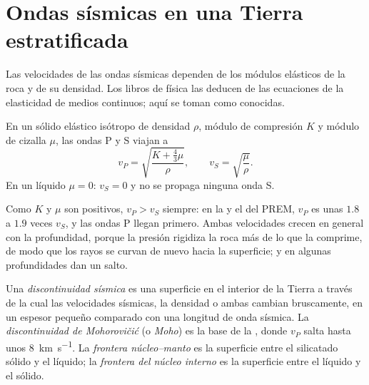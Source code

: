 \section{Ondas sísmicas en una Tierra estratificada}

Las velocidades de las ondas sísmicas dependen de los módulos elásticos de la roca y de su densidad. Los libros de física
las deducen de las ecuaciones de la elasticidad de medios continuos; aquí se toman como conocidas.

\begin{proposition}\label{prop:b1:layered-earth:speeds}
En un sólido elástico isótropo de densidad $\rho$, módulo de compresión $K$ y módulo de cizalla $\mu$, las ondas P y S
viajan a
\[
  v_P = \sqrt{\frac{K + \tfrac43\mu}{\rho}}, \qquad v_S = \sqrt{\frac{\mu}{\rho}}.
\]
En un líquido $\mu = 0$: $v_S = 0$ y no se propaga ninguna onda S.
\end{proposition}
\admitted

Como $K$ y $\mu$ son positivos, $v_P > v_S$ siempre: en la  y el  del PREM, $v_P$ es unas $1.8$ a $1.9$ veces
$v_S$, y las ondas P llegan primero. Ambas velocidades crecen en general con la profundidad, porque la presión rigidiza la
roca más de lo que la comprime, de modo que los rayos se curvan de nuevo hacia la superficie; y en algunas profundidades
dan un salto.

\begin{definition}
\label{def:b1:layered-earth:discontinuity}
Una \emph{discontinuidad sísmica} es una superficie en el interior de la Tierra a través de
la cual las velocidades sísmicas, la densidad o ambas cambian bruscamente, en un espesor pequeño comparado con una longitud
de onda sísmica. La \emph{discontinuidad de Mohorovičić} (o \emph{Moho})
es la base de la , donde $v_P$ salta hasta unos \qty{8}{km.s^{-1}}. La \emph{frontera núcleo--manto} es la superficie entre el  silicatado sólido y el  líquido; la \emph{frontera del núcleo
interno} es la superficie entre el  líquido y el  sólido.
\end{definition}

